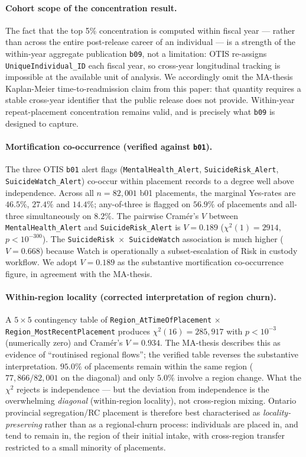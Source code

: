 \documentclass[article,shortnames,nojss]{jss}
\newcommand{\OTIS}{\textsf{OTIS}}
\begin{document}
\paragraph{Cohort scope of the concentration result.}
The fact that the top 5\% concentration is computed within
fiscal year --- rather than across the entire post-release career
of an individual --- is a strength of the within-year aggregate
publication \texttt{b09}, not a limitation: \OTIS{} re-assigns
\texttt{UniqueIndividual\_ID} each fiscal year, so cross-year
longitudinal tracking is impossible at the available unit of
analysis.  We accordingly omit the MA-thesis Kaplan-Meier
time-to-readmission claim from this paper: that quantity
requires a stable cross-year identifier that the public
release does not provide.  Within-year repeat-placement
concentration remains valid, and is precisely what \texttt{b09}
is designed to capture.

\paragraph{Mortification co-occurrence (verified against \texttt{b01}).}
The three \OTIS{} \texttt{b01} alert flags
(\texttt{MentalHealth\_Alert}, \texttt{SuicideRisk\_Alert},
\texttt{SuicideWatch\_Alert}) co-occur within placement records to a
degree well above independence.  Across all $n=82{,}001$ b01
placements, the marginal Yes-rates are $46.5\%$, $27.4\%$ and
$14.4\%$; any-of-three is flagged on $56.9\%$ of placements and
all-three simultaneously on $8.2\%$.  The pairwise Cramér's $V$
between \texttt{MentalHealth\_Alert} and
\texttt{SuicideRisk\_Alert} is $V=0.189$
($\chi^2(1)=2914$, $p<10^{-300}$).  The
\texttt{SuicideRisk}~$\times$~\texttt{SuicideWatch} association is
much higher ($V=0.668$) because Watch is operationally a
subset-escalation of Risk in custody workflow.  We adopt
$V=0.189$ as the substantive mortification co-occurrence figure,
in agreement with the MA-thesis.

\paragraph{Within-region locality (corrected interpretation of region churn).}
A $5\times5$ contingency table of
\texttt{Region\_AtTimeOfPlacement} $\times$
\texttt{Region\_MostRecentPlacement} produces
$\chi^2(16)=285{,}917$ with $p<10^{-3}$ (numerically zero) and
Cramér's $V=0.934$.  The MA-thesis describes this as evidence of
``routinised regional flows''; the verified table reverses the
substantive interpretation.  $95.0\%$ of placements remain within
the same region ($77{,}866/82{,}001$ on the diagonal) and only
$5.0\%$ involve a region change.  What the $\chi^2$ rejects is
independence --- but the deviation from independence is the
overwhelming \emph{diagonal} (within-region locality), not
cross-region mixing.  Ontario provincial segregation/RC
placement is therefore best characterised as
\emph{locality-preserving} rather than as a regional-churn
process: individuals are placed in, and tend to remain in, the
region of their initial intake, with cross-region transfer
restricted to a small minority of placements.
\end{document}
